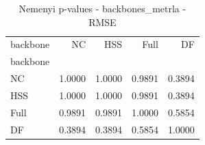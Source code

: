 \begin{table}
\caption{Nemenyi p-values - backbones_metrla - RMSE}
\label{tab:nemenyi_backbones_metrla_rmse}
\begin{tabular}{lrrrr}
\toprule
backbone & NC & HSS & Full & DF \\
backbone &  &  &  &  \\
\midrule
NC & 1.0000 & 1.0000 & 0.9891 & 0.3894 \\
HSS & 1.0000 & 1.0000 & 0.9891 & 0.3894 \\
Full & 0.9891 & 0.9891 & 1.0000 & 0.5854 \\
DF & 0.3894 & 0.3894 & 0.5854 & 1.0000 \\
\bottomrule
\end{tabular}
\end{table}
